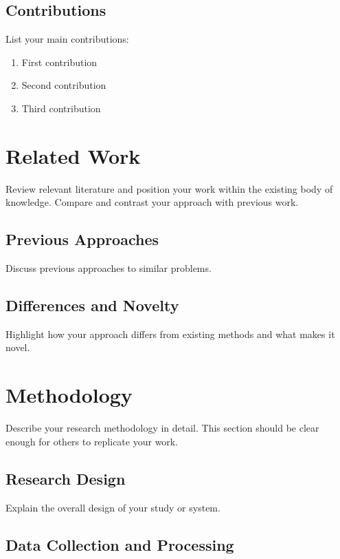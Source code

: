 \documentclass[11pt,a4paper]{article}
\theoremstyle{definition}
\begin{document}
\subsection{Contributions}

List your main contributions:
\begin{enumerate}
    \item First contribution
    \item Second contribution
    \item Third contribution
\end{enumerate}

\section{Related Work}

Review relevant literature and position your work within the existing body of knowledge. Compare and contrast your approach with previous work.

\subsection{Previous Approaches}

Discuss previous approaches to similar problems.

\subsection{Differences and Novelty}

Highlight how your approach differs from existing methods and what makes it novel.

\section{Methodology}

Describe your research methodology in detail. This section should be clear enough for others to replicate your work.

\subsection{Research Design}

Explain the overall design of your study or system.

\subsection{Data Collection and Processing}
\end{document}
